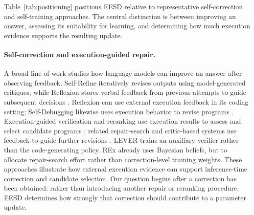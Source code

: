 \documentclass{article}
\newcommand{\method}{\textsc{EESD}\xspace}
\begin{document}
Table~\ref{tab:positioning} positions \method relative to representative
self-correction and self-training approaches. The central distinction
is between improving an answer, assessing its suitability for learning,
and determining how much execution evidence supports the resulting
update.

\paragraph{Self-correction and execution-guided repair.}
A broad line of work studies how language models can improve an answer
after observing feedback. Self-Refine iteratively revises outputs using
model-generated critiques, while Reflexion stores verbal feedback from
previous attempts to guide subsequent decisions
\citep{madaan2023selfrefine,shinn2023reflexion}. Reflexion can use external execution feedback in its coding setting; Self-Debugging likewise uses execution behavior to revise programs
\citep{chen2024selfdebug}. Execution-guided verification and reranking
use execution results to assess and select candidate programs
\citep{ni2023lever,li2025sstar}; related repair-search and critic-based
systems use feedback to guide further revisions
\citep{tang2024rex,tao2026execcritic}. LEVER trains an auxiliary verifier rather than the code-generating policy. REx already uses Bayesian beliefs, but to allocate repair-search effort rather than correction-level training weights. These approaches illustrate how
external execution evidence can support inference-time correction
and candidate selection. Our question begins after a correction has
been obtained: rather than introducing another repair or reranking
procedure, \method determines how strongly that correction should
contribute to a parameter update.
\end{document}
